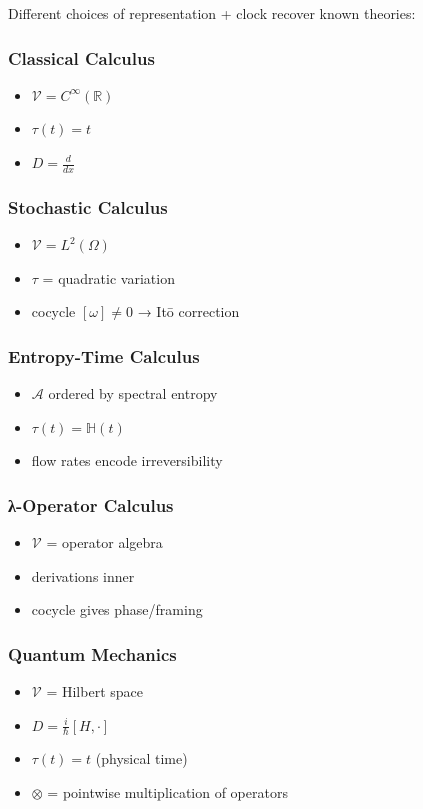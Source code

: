 \documentclass[12pt, oneside]{article}
\newcommand{\A}{\mathcal{A}}
\begin{document}
Different choices of representation + clock recover known theories:

\subsubsection{Classical Calculus}
\begin{itemize}
    \item $\mathcal{V} = C^\infty(\mathbb{R})$
    \item $\tau(t) = t$
    \item $D = \frac{d}{dx}$
\end{itemize}

\subsubsection{Stochastic Calculus}
\begin{itemize}
    \item $\mathcal{V} = L^2(\Omega)$
    \item $\tau$ = quadratic variation
    \item cocycle $[\omega] \neq 0$ → Itō correction
\end{itemize}

\subsubsection{Entropy-Time Calculus}
\begin{itemize}
    \item $\A$ ordered by spectral entropy
    \item $\tau(t) = \mathbb{H}(t)$
    \item flow rates encode irreversibility
\end{itemize}

\subsubsection{λ-Operator Calculus}
\begin{itemize}
    \item $\mathcal{V}$ = operator algebra
    \item derivations inner
    \item cocycle gives phase/framing
\end{itemize}

\subsubsection{Quantum Mechanics}
\begin{itemize}
    \item $\mathcal{V}$ = Hilbert space
    \item $D = \frac{i}{\hbar}[H, \cdot]$
    \item $\tau(t) = t$ (physical time)
    \item $\otimes$ = pointwise multiplication of operators
\end{itemize}
\end{document}
